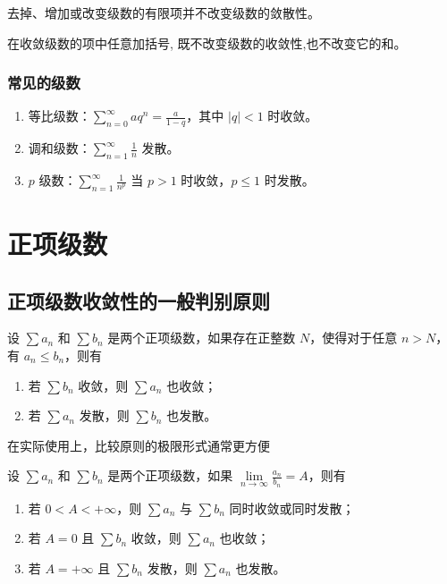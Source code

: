 \begin{theorem}
    去掉、增加或改变级数的有限项并不改变级数的敛散性。
\end{theorem}

\begin{theorem}
    在收敛级数的项中任意加括号, 既不改变级数的收敛性,也不改变它的和。
\end{theorem}

\subsubsection{常见的级数}

\begin{enumerate}
    \item 等比级数：$\sum\limits_{n=0}^{\infty} a q^{n} = \frac{a}{1-q}$，其中 $|q| < 1$ 时收敛。
    \item 调和级数：$\sum\limits_{n=1}^{\infty} \frac{1}{n}$ 发散。
    \item $p$ 级数：$\sum\limits_{n=1}^{\infty} \frac{1}{n^{p}}$ 当 $p > 1$ 时收敛，$p \leq 1$ 时发散。
\end{enumerate}

\section{正项级数}

\subsection{正项级数收敛性的一般判别原则}

\begin{theorem}[比较原则]
    设 $\sum a_{n}$ 和 $\sum b_{n}$ 是两个正项级数，如果存在正整数 $N$，使得对于任意 $n > N$，有 $a_{n} \leq b_{n}$，则有
    \begin{enumerate}
        \item 若 $\sum b_{n}$ 收敛，则 $\sum a_{n}$ 也收敛；
        \item 若 $\sum a_{n}$ 发散，则 $\sum b_{n}$ 也发散。
    \end{enumerate}
\end{theorem}

在实际使用上，比较原则的极限形式通常更方便

\begin{theorem}[比较原则的极限形式]
    设 $\sum a_{n}$ 和 $\sum b_{n}$ 是两个正项级数，如果 $\lim\limits_{n \to \infty} \frac{a_{n}}{b_{n}} = A$，则有
    \begin{enumerate}
        \item 若 $0 < A < +\infty$，则 $\sum a_{n}$ 与 $\sum b_{n}$ 同时收敛或同时发散；
        \item 若 $A = 0$ 且 $\sum b_{n}$ 收敛，则 $\sum a_{n}$ 也收敛；
        \item 若 $A = +\infty$ 且 $\sum b_{n}$ 发散，则 $\sum a_{n}$ 也发散。
    \end{enumerate}
\end{theorem}

